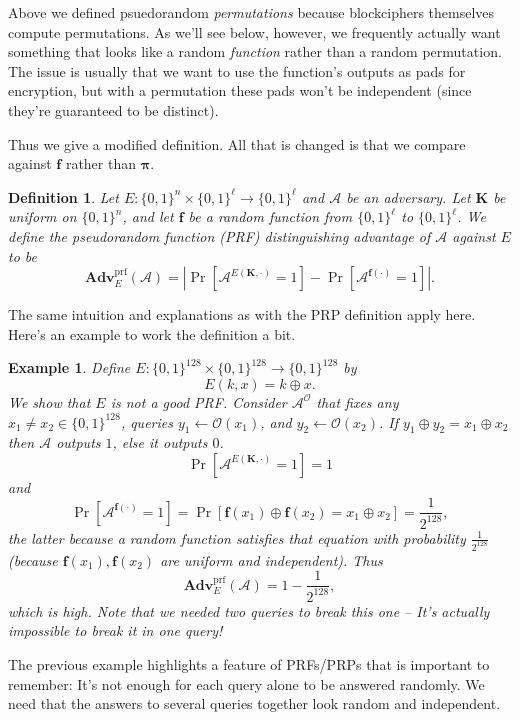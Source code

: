 \documentclass[11pt]{article}
\newtheorem{definition}{Definition}
\newtheorem{example}{Example}
\newcommand{\calA}{\mathcal{A}}
\newcommand{\calO}{\mathcal{O}}
\newcommand{\Adv}{\mathbf{Adv}}
\newcommand{\AdvPRF}[2]{\Adv^{\mathrm{prf}}_{#1}({#2})}
\newcommand{\bits}{\{0,1\}}
\newcommand{\bK}{\mathbf{K}}
\newcommand{\bof}{\mathbf{f}}
\newcommand{\bop}{\bm{\pi}}
\begin{document}
Above we defined psuedorandom \emph{permutations} because blockciphers 
themselves compute permutations. As we'll see below, however, we frequently
actually want something that looks like a random \emph{function} rather
than a random permutation. The issue is usually that we want to use the
function's outputs as pads for encryption, but with a permutation these
pads won't be independent (since they're guaranteed to be distinct).

Thus we give a modified definition. All that is changed is that we
compare against $\bof$ rather than $\bop$.
\begin{definition}
    Let $E:\bits^n\times\bits^\ell\to\bits^\ell$ 
    and $\calA$ be an adversary.
    Let $\bK$ be uniform on $\bits^n$, and let $\bof$ be a random function
    from $\bits^\ell$ to $\bits^\ell$.
    We define the \emph{pseudorandom function (PRF) distinguishing advantage
    of $\calA$ against $E$} to be
    \[
        \AdvPRF{E}{\calA} =
        \left|\Pr[\calA^{E(\bK,\cdot)}=1]-\Pr[\calA^{\bof(\cdot)}=1]\right|.
    \]
\end{definition}

The same intuition and explanations as with the PRP definition apply here.
Here's an example to work the definition a bit.
\begin{example}
    Define $E:\bits^{128}\times\bits^{128}\to\bits^{128}$ by
    \[
       E(k,x)=k\oplus x.
    \]
    We show that
    $E$ is not a good PRF. Consider $\calA^\calO$ that fixes any
    $x_1\neq x_2\in\bits^{128}$, 
    queries $y_1 \gets \calO(x_1)$, and
    $y_2 \gets \calO(x_2)$. 
    If $y_1\oplus y_2 = x_1 \oplus x_2$ then $\calA$ outputs $1$, 
    else it outputs $0$.
    \[
        \Pr[\calA^{E(\bK,\cdot)}=1]=1
    \]
    and
    \[
        \Pr[\calA^{\bof(\cdot)}=1] 
        =
        \Pr[\bof(x_1)\oplus \bof(x_2)=x_1\oplus x_2] = \frac{1}{2^{128}},
    \]
    the latter because a random function satisfies that
    equation
    with probability $\frac{1}{2^{128}}$ (because $\bof(x_1),\bof(x_2)$ are
    uniform and independent). Thus
    \[
        \AdvPRF{E}{\calA} = 1 - \frac{1}{2^{128}},
    \]
    which is high. Note that we needed two queries to break this one -- It's
    actually impossible to break it in one query!
\end{example}
The previous example highlights a feature of PRFs/PRPs that is important
to remember: It's not enough for each query alone to be answered randomly.
We need that the answers to several queries together look random and
independent.
\end{document}
